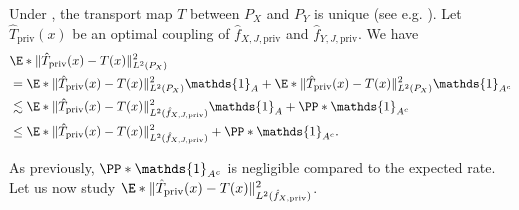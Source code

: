 \documentclass{article}
\newcommand{\1}{\mathds{1}}
\theoremstyle{plain}
\theoremstyle{definition}
\theoremstyle{remark}
\begin{document}
Under , the transport map $T$ between $P_X$ and $P_Y$ is unique (see e.g.  \citep[Th.~1.17]{santambrogio2015optimal}). Let $\hat{T}_{\textrm{priv}}(x)$ be an optimal coupling of $\hat{f}_{X, J, \textrm{priv} }$ and $\hat{f}_{Y, J, \textrm{priv} }$. We have
\begin{equation}
\label{eq:jihbojhbqsdf}
    \begin{aligned}
        &\E*{\| \hat{T}_{\textrm{priv}}(x) - T(x) \|^2_{L^2(P_X)}} \\
        &=
        \E*{\| \hat{T}_{\textrm{priv}}(x) - T(x) \|^2_{L^2(P_X)} \1_{A}}
        +
        \E*{\| \hat{T}_{\textrm{priv}}(x) - T(x) \|^2_{L^2(P_X)} \1_{A^c}} \\
        &\lesssim 
        \E*{\| \hat{T}_{\textrm{priv}}(x) - T(x) \|^2_{L^2({\hat{f}_{X, J,  \textrm{priv} })}}  \1_{A}}
        +
        \PP*{\1_{A^c}} \\
        &\leq 
        \E*{\| \hat{T}_{\textrm{priv}}(x) - T(x) \|^2_{L^2({\hat{f}_{X, J,  \textrm{priv} })}}  }
        +
        \PP*{\1_{A^c}} .
    \end{aligned}
\end{equation}

As previously, $\PP*{\1_{A^c}}$ is negligible compared to the expected rate. Let us now study 
$\E*{\| \hat{T}_{\textrm{priv}}(x) - T(x) \|^2_{L^2({\hat{f}_{X, \textrm{priv} }})}  }$. 
\end{document}
